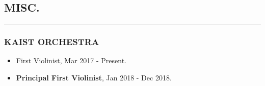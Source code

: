 \documentclass[10pt,a4]{article}
\begin{document}
\begin{small}
%
%
%
%
%
%
%
%
%


\subsection*{MISC.}
\hrule
\vspace{0.2cm}

\subsubsection*{KAIST ORCHESTRA}
\begin{itemize}
	\item First Violinist, Mar 2017 - Present.
	
	\item {\bf Principal First Violinist}, Jan 2018 - Dec 2018.
	
\end{itemize}


\end{small}
\end{document}
